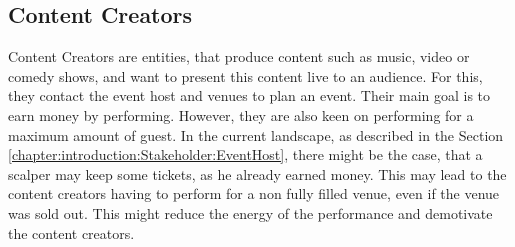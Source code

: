 \subsection{Content Creators}
Content Creators are entities, that produce content such as music, video or comedy shows, and want to present this content live to an audience. For this, they contact the event host and venues to plan an event. Their main goal is to earn money by performing. However, they are also keen on performing for a maximum amount of guest. In the current landscape, as described in the Section \ref{chapter:introduction:Stakeholder:EventHost}, there might be the case, that a scalper may keep some tickets, as he already earned money. This may lead to the content creators having to perform for a non fully filled venue, even if the venue was sold out. This might reduce the energy of the performance and demotivate the content creators.
